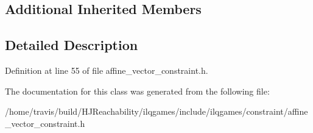 \subsection*{Additional Inherited Members}


\subsection{Detailed Description}


Definition at line 55 of file affine\+\_\+vector\+\_\+constraint.\+h.



The documentation for this class was generated from the following file\+:\begin{DoxyCompactItemize}
\item 
/home/travis/build/\+H\+J\+Reachability/ilqgames/include/ilqgames/constraint/affine\+\_\+vector\+\_\+constraint.\+h\end{DoxyCompactItemize}
